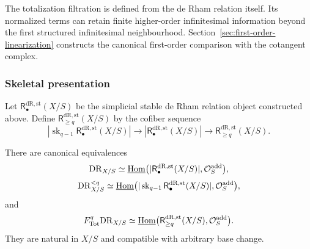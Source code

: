 \begin{remark}
The totalization filtration is defined from the de Rham relation itself. Its
normalized terms can retain finite higher-order infinitesimal information beyond the
first structured infinitesimal neighbourhood. Section~\ref{sec:first-order-linearization}
constructs the canonical first-order comparison with the cotangent complex.
\end{remark}

\subsubsection{Skeletal presentation}
\label{subsec:skeletal-presentation}

Let \(\mathsf{R}^{\mathrm{dR},\mathrm{st}}_\bullet(X/S)\) be the simplicial
stable de Rham relation object constructed above. Define
\(\mathsf{R}^{\mathrm{dR},\mathrm{st}}_{\geq q}(X/S)\) by the cofiber sequence
\[
  |\operatorname{sk}_{q-1}\mathsf{R}^{\mathrm{dR},\mathrm{st}}_\bullet(X/S)|
  \longrightarrow
  |\mathsf{R}^{\mathrm{dR},\mathrm{st}}_\bullet(X/S)|
  \longrightarrow
  \mathsf{R}^{\mathrm{dR},\mathrm{st}}_{\geq q}(X/S).
\]

\begin{theorem}
\label{thm:skeletal-totalization-presentation}
There are canonical equivalences
\[
  \mathrm{DR}_{X/S}
  \simeq
  \underline{\operatorname{Hom}}
  \bigl(|\mathsf{R}^{\mathrm{dR},\mathrm{st}}_\bullet(X/S)|,\mathcal O_S^{\mathrm{add}}\bigr),
\]
\[
  \mathrm{DR}^{<q}_{X/S}
  \simeq
  \underline{\operatorname{Hom}}
  \bigl(|\operatorname{sk}_{q-1}\mathsf{R}^{\mathrm{dR},\mathrm{st}}_\bullet(X/S)|,
        \mathcal O_S^{\mathrm{add}}\bigr),
\]
and
\[
  F^q_{\mathrm{Tot}}\mathrm{DR}_{X/S}
  \simeq
  \underline{\operatorname{Hom}}
  \bigl(\mathsf{R}^{\mathrm{dR},\mathrm{st}}_{\geq q}(X/S),\mathcal O_S^{\mathrm{add}}\bigr).
\]
They are natural in \(X/S\) and compatible with arbitrary base change.
\end{theorem}


